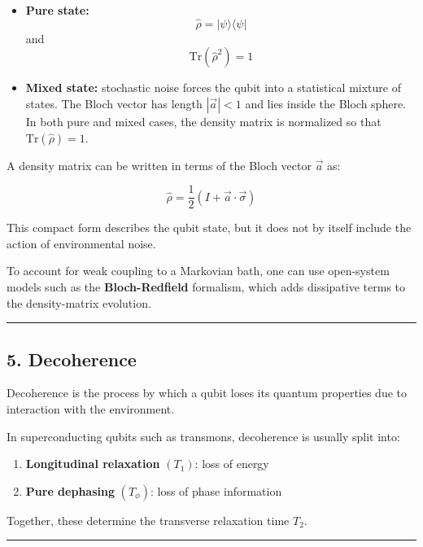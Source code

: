 \documentclass[
]{article}
\providecommand{\tightlist}{%
  \setlength{\itemsep}{0pt}\setlength{\parskip}{0pt}}
\begin{document}
\begin{itemize}
\item
  \textbf{Pure state:}\\
  \[
  \hat{\rho} = |\psi\rangle\langle\psi|
  \] and \[
  \mathrm{Tr}(\hat{\rho}^2) = 1
  \]
\item
  \textbf{Mixed state:} stochastic noise forces the qubit into a
  statistical mixture of states. The Bloch vector has length
  \(|\vec{a}| < 1\) and lies inside the Bloch sphere. In both pure and
  mixed cases, the density matrix is normalized so that
  \(\mathrm{Tr}(\hat{\rho}) = 1\).
\end{itemize}

A density matrix can be written in terms of the Bloch vector \(\vec{a}\)
as:

\[
\hat{\rho} = \frac{1}{2}\left(I + \vec{a}\cdot\vec{\sigma}\right)
\]

This compact form describes the qubit state, but it does not by itself
include the action of environmental noise.

To account for weak coupling to a Markovian bath, one can use
open-system models such as the \textbf{Bloch-Redfield} formalism, which
adds dissipative terms to the density-matrix evolution.

\begin{center}\rule{0.5\linewidth}{0.5pt}\end{center}

\subsection{5. Decoherence}\label{decoherence}

Decoherence is the process by which a qubit loses its quantum properties
due to interaction with the environment.

In superconducting qubits such as transmons, decoherence is usually
split into:

\begin{enumerate}
\def\labelenumi{\arabic{enumi}.}
\tightlist
\item
  \textbf{Longitudinal relaxation} \((T_1)\): loss of energy\\
\item
  \textbf{Pure dephasing} \((T_\phi)\): loss of phase information
\end{enumerate}

Together, these determine the transverse relaxation time \(T_2\).

\begin{center}\rule{0.5\linewidth}{0.5pt}\end{center}
\end{document}
